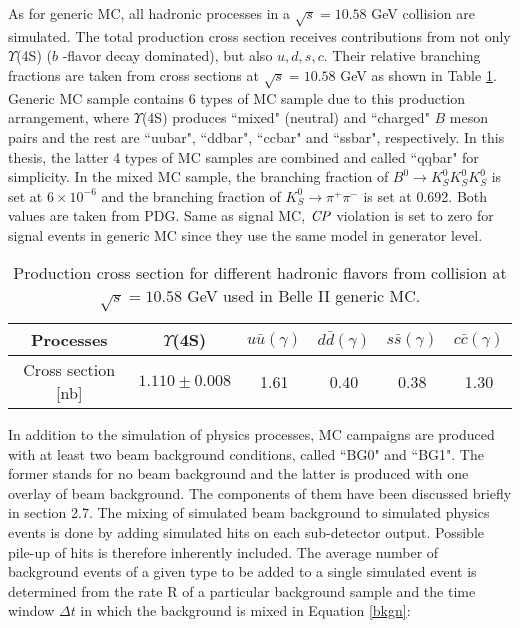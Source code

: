  As for generic MC, all hadronic processes in a  $\sqrt{s} = 10.58 $ GeV collision are simulated. The total production cross section receives contributions from not only $\Upsilon$(4S) ($b$ -flavor decay dominated), but also $u, d, s, c$. 
 Their relative branching fractions are taken from cross sections at  $\sqrt{s} = 10.58 $ GeV as shown in Table \ref{tab:generic_br}. Generic MC sample contains 6 types of MC sample due to this production arrangement, where $\Upsilon$(4S) produces ``mixed" (neutral) and ``charged" $B$ meson pairs and the rest are ``uubar", ``ddbar", ``ccbar" and ``ssbar", respectively. In this thesis, the latter 4 types of MC samples are combined and called ``qqbar" for simplicity. In the mixed MC sample, the branching fraction of $B^0 \to K_S^0  K_S^0  K_S^0$ is set at $6 \times 10^{-6}$ and the branching fraction of $K_S^0 \to \pi^{+}\pi^{-}$ is set at 0.692. Both values are taken from PDG\cite{pdg}. Same as signal MC, $\it{CP}$ violation is set to zero for signal events in generic MC since they use the same model in generator level.
 
 \begin{table}
 	\caption{Production cross section for different hadronic flavors from collision at  $\sqrt{s} = 10.58 $ GeV used in Belle II generic MC.\cite{b2book}}
 	\label{tab:generic_br}
 	\centering
 	\begin{tabular}{c|c|c|c|c|c}
 		\hline 
 	Processes & $\Upsilon$(4S) & $u\bar{u}(\gamma)$ & $d\bar{d}(\gamma)$ & $s\bar{s}(\gamma)$ & $c\bar{c}(\gamma)$ \\
 		\hline 
 	Cross section [nb] & $1.110\pm0.008$ & 1.61 & 0.40 & 0.38 & 1.30 \\
 	\hline
 	\end{tabular}
 \end{table}
 
In addition to the simulation of physics processes,  MC campaigns are produced with at least two beam background conditions, called ``BG0" and ``BG1". The former stands for no beam background and the latter is produced with one overlay of beam background. The components of them have been discussed briefly in section 2.7. The mixing of simulated beam background to simulated physics events is done by adding simulated hits on each sub-detector output. Possible pile-up of hits is therefore inherently included. The average number of background events of a given type to be added to a single simulated event is determined from the rate R of a particular background sample and the time window $\Delta t$ in which the background is mixed in Equation \ref{bkgn}:

